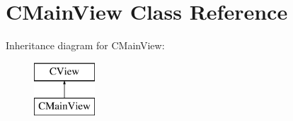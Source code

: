 \hypertarget{class_c_main_view}{}\section{C\+Main\+View Class Reference}
\label{class_c_main_view}
Inheritance diagram for C\+Main\+View\+:\begin{figure}[H]
\begin{center}
\leavevmode
\includegraphics[height=2.000000cm]{class_c_main_view}
\end{center}
\end{figure}
